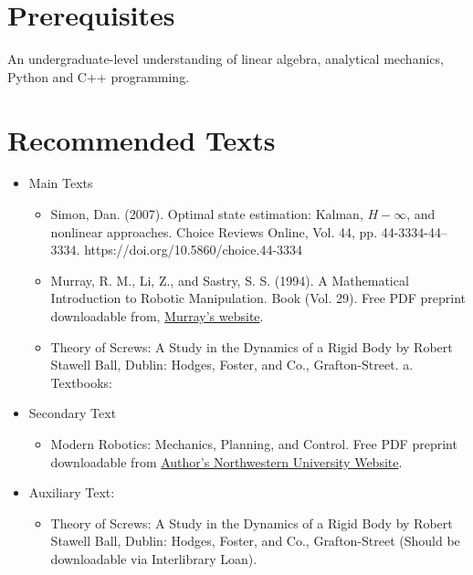\section{Prerequisites}

An undergraduate-level understanding of linear algebra, analytical mechanics, Python and C++ programming.

\section{Recommended Texts}
\begin{itemize}
	\item  	Main Texts
	\begin{itemize}
		\item Simon, Dan. (2007). Optimal state estimation: Kalman, $H-\infty$, and nonlinear approaches. Choice Reviews Online, Vol. 44, pp. 44-3334-44–3334. https://doi.org/10.5860/choice.44-3334
		\item Murray, R. M., Li, Z., and Sastry, S. S. (1994). A Mathematical Introduction to Robotic Manipulation. Book (Vol. 29). Free PDF preprint downloadable from, \href{https://www.cds.caltech.edu/~murray/books/MLS/pdf/mls94-complete.pdf }{Murray's website}.
		\item Theory of Screws: A Study in the Dynamics of a Rigid Body by Robert Stawell Ball, Dublin: Hodges, Foster, and Co., Grafton-Street. a. Textbooks:
	\end{itemize} 
	\item Secondary Text
	\begin{itemize}
		\item Modern Robotics: Mechanics, Planning, and Control. Free PDF preprint downloadable from \href{ http://hades.mech.northwestern.edu/images/7/7f/MR.pdf}{Author's Northwestern University Website}.		
	\end{itemize} 
    \item 
    Auxiliary Text: 
    \begin{itemize}
    	\item Theory of Screws: A Study in the Dynamics of a Rigid Body by Robert Stawell Ball, Dublin: Hodges, Foster, and Co., Grafton-Street (Should be downloadable via Interlibrary Loan).
    \end{itemize}
\end{itemize}

